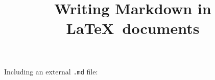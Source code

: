 \documentclass{article}
\title{Writing Markdown in \LaTeX\ documents}
\author{}
\date{}
\begin{document}
\maketitle

Including an external \texttt{.md} file:

\end{document}
